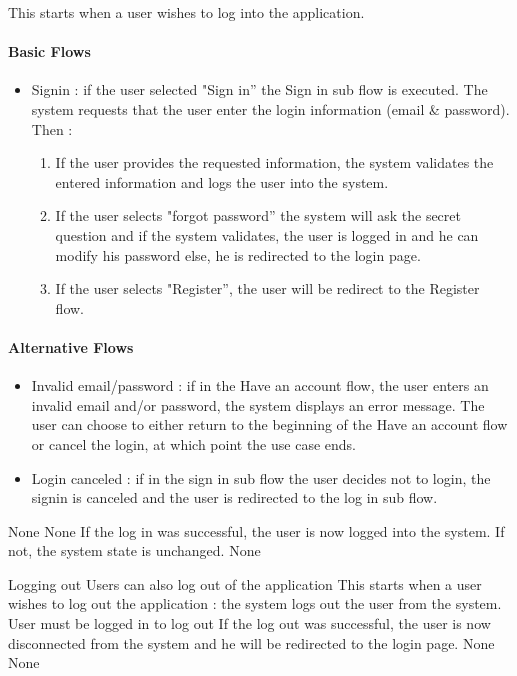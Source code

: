 {
  This starts when a user wishes to log into the application.

  \paragraph{Basic Flows}
  \begin{itemize}
    \item Signin : if the user selected "Sign in” the Sign in sub flow is executed. The system requests that the user enter the login information (email \& password). Then :
    \begin{enumerate}
      \item If the user provides the requested information, the system validates the entered information and logs the user into the system.
      \item If the user selects "forgot password”  the system will ask the secret question and if the system validates, the user is logged in and he can modify his password else, he is redirected to the login page.
      \item If the user selects "Register”, the user will be redirect to the Register flow.
    \end{enumerate}
  \end{itemize}

  \paragraph{Alternative Flows}
  \begin{itemize}
    \item Invalid email/password : if in the Have an account flow, the user enters an invalid email and/or password, the system displays an error message. The user can choose to either return to the beginning of the Have an account flow or cancel the login, at which point the use case ends.
    \item Login canceled : if in the sign in sub flow the user decides not to login, the signin is canceled and the user is redirected to the log in sub flow.
  \end{itemize}
}
{None}
{None}
{If the log in was successful, the user is now logged into the system.  If not, the system state is unchanged.}
{None}

\usecasedesc
{Logging out}
{Users can also log out of the application}
{
  This starts when a user wishes to log out the application : the system logs out the user from the system.
}
{User must be logged in to log out}
{
  If the log out was successful, the user is now disconnected from the system and he will be redirected to the login page.
}
{None}
{None}

